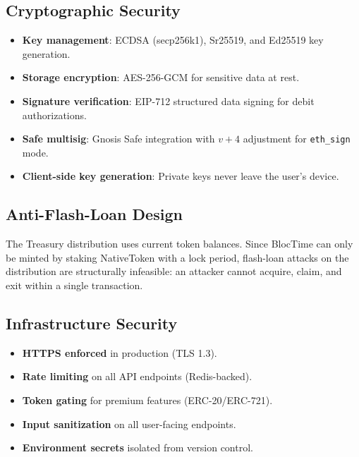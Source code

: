 \documentclass[11pt,a4paper]{article}
\begin{document}
\subsection{Cryptographic Security}

\begin{itemize}
    \item \textbf{Key management}: ECDSA (secp256k1), Sr25519, and Ed25519 key generation.
    \item \textbf{Storage encryption}: AES-256-GCM for sensitive data at rest.
    \item \textbf{Signature verification}: EIP-712 structured data signing for debit authorizations.
    \item \textbf{Safe multisig}: Gnosis Safe integration with $v + 4$ adjustment for \texttt{eth\_sign} mode.
    \item \textbf{Client-side key generation}: Private keys never leave the user's device.
\end{itemize}

\subsection{Anti-Flash-Loan Design}

The Treasury distribution uses current token balances. Since BlocTime can only be minted by staking NativeToken with a lock period, flash-loan attacks on the distribution are structurally infeasible: an attacker cannot acquire, claim, and exit within a single transaction.

\subsection{Infrastructure Security}

\begin{itemize}
    \item \textbf{HTTPS enforced} in production (TLS 1.3).
    \item \textbf{Rate limiting} on all API endpoints (Redis-backed).
    \item \textbf{Token gating} for premium features (ERC-20/ERC-721).
    \item \textbf{Input sanitization} on all user-facing endpoints.
    \item \textbf{Environment secrets} isolated from version control.
\end{itemize}

\end{document}
